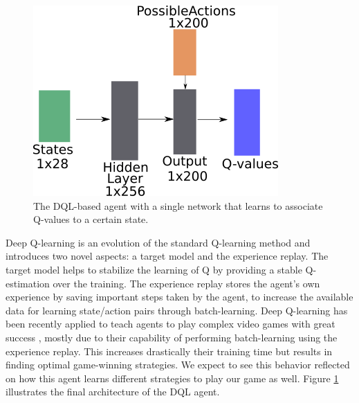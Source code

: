 \documentclass[a4paper,conference]{IEEEtran}
\begin{document}
\begin{figure}
    \centering
    \includegraphics[width=0.7\columnwidth]{DQLNetwork.png}
    \caption{The DQL-based agent with a single network that learns to associate Q-values to a certain state.}
    \label{fig:dqlNetwork}
\end{figure}

Deep Q-learning is an evolution of the standard Q-learning method and introduces two novel aspects: a target model and the experience replay. The target model helps to stabilize the learning of Q by providing a stable Q-estimation over the training. The experience replay stores the agent's own experience by saving important steps taken by the agent, to increase the available data for learning state/action pairs through batch-learning. Deep Q-learning has been recently applied to teach agents to play complex video games with great success \cite{hausknecht2015deep, hester2018deep, meng2019qualitative}, mostly due to their capability of performing batch-learning using the experience replay. This increases drastically their training time but results in finding optimal game-winning strategies. We expect to see this behavior reflected on how this agent learns different strategies to play our game as well. Figure \ref{fig:dqlNetwork} illustrates the final architecture of the DQL agent.




\end{document}
